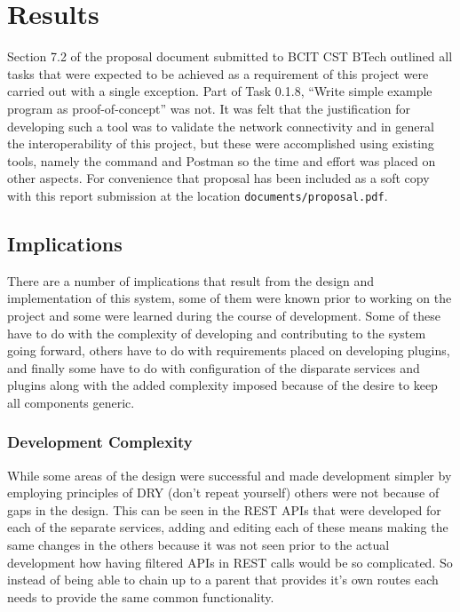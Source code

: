 \section{Results}\label{sec:results}

  Section 7.2 of the proposal document submitted to BCIT CST BTech outlined all
  tasks that were expected to be achieved as a requirement of this project were
  carried out with a single exception. Part of Task 0.1.8, ``Write simple
  example program as proof-of-concept'' was not. It was felt that the
  justification for developing such a tool was to validate the network
  connectivity and in general the interoperability of this project, but these
  were accomplished using existing tools, namely the command  and
  Postman so the time and effort was placed on other aspects. For convenience
  that proposal has been included as a soft copy with this report submission at
  the location \texttt{documents/proposal.pdf}.

  \subsection{Implications}\label{sec:results-implications}

    There are a number of implications that result from the design and
    implementation of this system, some of them were known prior to working on
    the project and some were learned during the course of development. Some
    of these have to do with the complexity of developing and contributing to
    the system going forward, others have to do with requirements placed on
    developing plugins, and finally some have to do with configuration of the
    disparate services and plugins along with the added complexity imposed
    because of the desire to keep all components generic.

    \subsubsection{Development Complexity}

      While some areas of the design were successful and made development
      simpler by employing principles of DRY (don't repeat yourself) others
      were not because of gaps in the design. This can be seen in the REST
      APIs that were developed for each of the separate services, adding and
      editing each of these means making the same changes in the others
      because it was not seen prior to the actual development how having
      filtered APIs in REST calls would be so complicated. So instead of
      being able to chain up to a parent that provides it's own routes each
      needs to provide the same common functionality.

